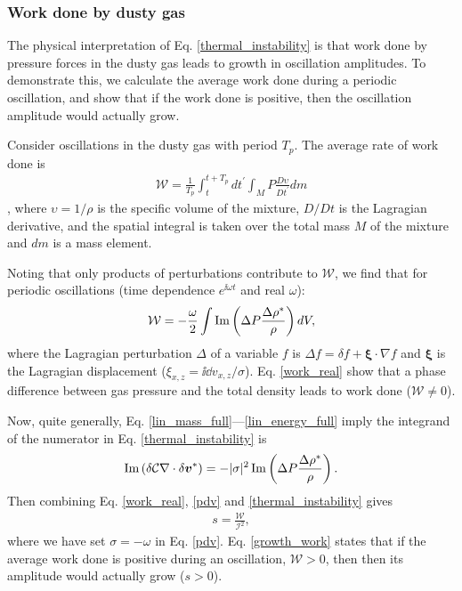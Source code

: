 

\subsubsection{Work done by dusty gas} 

The physical interpretation of Eq. \ref{thermal_instability} is that 
work done by pressure forces in the dusty gas leads to growth in
oscillation amplitudes. To demonstrate this, we calculate the average
work done during a periodic oscillation, and show that if the work
done is positive, then the 
oscillation amplitude would actually grow. 

Consider oscillations in the dusty gas with period $T_p$. 
The average rate of work done is 
\begin{align}
  \mathcal{W} = \frac{1}{T_p}\int^{t+T_p}_{t}dt^\prime\int_M P
  \frac{D\upsilon}{Dt^\prime} dm \label{work_def} 
\end{align}
\citep{cox67}, 
where $\upsilon=1/\rho$ is the specific volume of the mixture, $D/Dt$
is the Lagragian derivative, and the 
spatial integral is taken over the total mass $M$ of the mixture and
$dm$ is a mass element. 

Noting that only products of perturbations contribute to
$\mathcal{W}$, we find that for periodic oscillations (time dependence 
$e^{\ii\omega t}$ and real $\omega$): 
\begin{align}
  \mathcal{W} = - \frac{\omega}{2} \int \operatorname{Im}\left(\Delta P
  \frac{\Delta \rho^*}{\rho}\right)dV,\label{work_real}
\end{align}
where %
 the Lagragian perturbation $\Delta$ of a variable $f$ is 
$\Delta f = \delta f + \bm{\xi}\cdot\nabla f$ and $\bm{\xi}$ is the
Lagragian displacement ($    \xi_{x,z} =  \ii \dd v_{x,z}/\sigma$).  
Eq. \ref{work_real} show that a phase difference between gas pressure and
the total density leads to work done
($\mathcal{W}\neq0$).  

Now, quite generally, Eq. \ref{lin_mass_full}---\ref{lin_energy_full} 
imply the integrand of the numerator in Eq. \ref{thermal_instability} 
is 
\begin{align} 
  \operatorname{Im} \left(\delta \mathcal{C}
  \nabla\cdot\delta \bm{v}^*\right) = 
  -|\sigma|^2\operatorname{Im} \left(\Delta P 
  \frac{\Delta\rho^*}{\rho}\right). \label{pdv}
\end{align}
Then combining Eq. \ref{work_real}, \ref{pdv} and
\ref{thermal_instability} 
gives  
\begin{align}
s = \frac{\mathcal{W}}{\mathcal{I}^2}, \label{growth_work}
\end{align}
where we have set $\sigma= - \omega$ in 
Eq. \ref{pdv}. Eq. \ref{growth_work} states that if the average work
done is positive during an oscillation, $\mathcal{W}>0$, then 
then its amplitude would actually grow ($s>0$).  %

